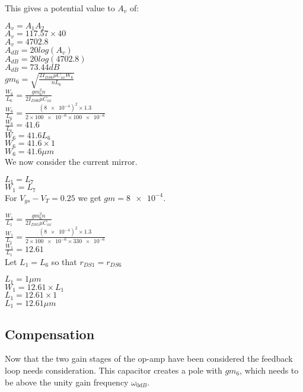 This gives a potential value to $A_{v}$ of:

$A_{v} = A_{1}A_{2}$ \\
$A_{v} = 117.57 \times 40$ \\
$A_{v} = 4702.8$ \\

$A_{dB} = 20log(A_{v})$ \\
$A_{dB} = 20log(4702.8)$ \\
$A_{dB} = 73.44dB$ \\

$gm_{6} = \sqrt{\frac{2I_{DS6}\mu C_{ox}W_{6}}{nL_{6}}}$ \\
$\frac{W_{6}}{L_{6}} = \frac{gm_{6}^{2}n}{2I_{DS6}\mu C_{ox}}$ \\
$\frac{W_{6}}{L_{6}} = \frac{(\num{8e-4})^{2} \times 1.3}{2 \times \num{100e-6} \times \num{100e-6}}$ \\
$\frac{W_{6}}{L_{6}} = 41.6$ \\

$W_{6} = 41.6L_{6}$ \\
$W_{6} = 41.6 \times 1$ \\
$W_{6} = 41.6\mu m$ \\

We now consider the current mirror.

$L_{1} = L_{7}$ \\
$W_{1} = L_{7}$ \\

For $V_{gs} - V_{T} = 0.25$ we get $gm = \num{8e-4}$.

$\frac{W_{1}}{L_{1}} = \frac{gm_{6}^{2}n}{2I_{DS1}\mu C_{ox}}$ \\
$\frac{W_{1}}{L_{1}} = \frac{(\num{8e-4})^{2} \times 1.3}{2 \times \num{100e-6} \times \num{330e-6}}$ \\
$\frac{W_{1}}{L_{1}} = 12.61$ \\

Let $L_{1} = L_{6}$ so that $r_{DS1} = r_{DS6}$ 

$L_{1} = 1\mu m$ \\
$W_{1} = 12.61 \times L_{1}$ \\
$L_{1} = 12.61 \times 1$ \\
$L_{1} = 12.61\mu m$ \\

\subsection{Compensation}

Now that the two gain stages of the op-amp have been considered the feedback loop needs consideration.
This capacitor creates a pole with $gm_{6}$, which needs to be above the unity gain frequency $\omega_{0dB}$.

